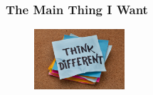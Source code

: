 \documentclass{beamer}
\begin{document}
\begin{frame}
  \frametitle{The Main Thing I Want}
  \begin{figure}[t]
    \centering \includegraphics[width=0.3\textwidth]{images/think-different.jpg}    
  \end{figure}
\end{frame}

\end{document}
